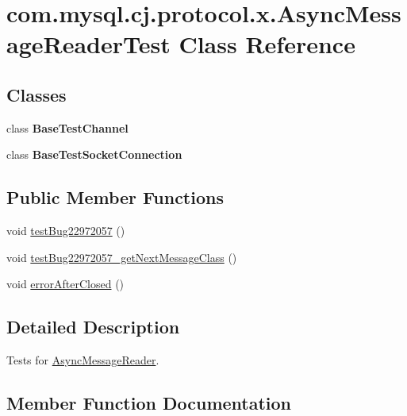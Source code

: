 \hypertarget{classcom_1_1mysql_1_1cj_1_1protocol_1_1x_1_1_async_message_reader_test}{}\section{com.\+mysql.\+cj.\+protocol.\+x.\+Async\+Message\+Reader\+Test Class Reference}
\label{classcom_1_1mysql_1_1cj_1_1protocol_1_1x_1_1_async_message_reader_test}
\subsection*{Classes}
\begin{DoxyCompactItemize}
\item 
class {\bfseries Base\+Test\+Channel}
\item 
class {\bfseries Base\+Test\+Socket\+Connection}
\end{DoxyCompactItemize}
\subsection*{Public Member Functions}
\begin{DoxyCompactItemize}
\item 
void \mbox{\hyperlink{classcom_1_1mysql_1_1cj_1_1protocol_1_1x_1_1_async_message_reader_test_a74de216dc92180e48ed4197bf4b16fa4}{test\+Bug22972057}} ()
\item 
void \mbox{\hyperlink{classcom_1_1mysql_1_1cj_1_1protocol_1_1x_1_1_async_message_reader_test_aedc99d3bfdf2ce338f8110cf8049adb3}{test\+Bug22972057\+\_\+get\+Next\+Message\+Class}} ()
\item 
void \mbox{\hyperlink{classcom_1_1mysql_1_1cj_1_1protocol_1_1x_1_1_async_message_reader_test_a7d74ac198355624b7961b71f2c365736}{error\+After\+Closed}} ()
\end{DoxyCompactItemize}


\subsection{Detailed Description}
Tests for \mbox{\hyperlink{classcom_1_1mysql_1_1cj_1_1protocol_1_1x_1_1_async_message_reader}{Async\+Message\+Reader}}. 

\subsection{Member Function Documentation}
\mbox{\label{classcom_1_1mysql_1_1cj_1_1protocol_1_1x_1_1_async_message_reader_test_a7d74ac198355624b7961b71f2c365736}} 
